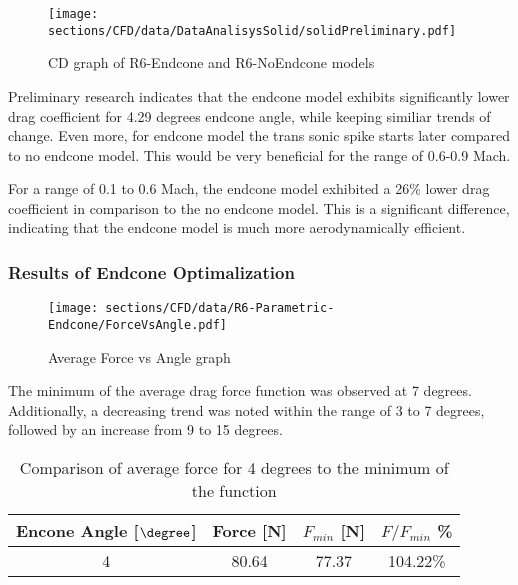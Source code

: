 \begin{figure}[H]
    \centering
    \texttt{[image: sections/CFD/data/DataAnalisysSolid/solidPreliminary.pdf]}
    \caption{CD graph of R6-Endcone and R6-NoEndcone models}
    \label{fig:preliminary}
\end{figure}
Preliminary research indicates that the endcone model exhibits significantly lower drag coefficient
for 4.29 degrees endcone angle, while keeping similiar trends of change. Even more, for endcone model
the trans sonic spike starts later compared to no endcone model. This would be very beneficial for the
range of 0.6-0.9 Mach.  
\begin{table}[H]
    \centering
    \caption{Average values and differences}
\end{table}
For a range of 0.1 to 0.6 Mach, the endcone model exhibited a 26\% lower drag coefficient in 
comparison to the no endcone model. This is a significant difference, indicating that the endcone
model is much more aerodynamically efficient.
\newpage

\subsubsection{Results of Endcone Optimalization}
\begin{figure}[H]
    \centering
    \texttt{[image: sections/CFD/data/R6-Parametric-Endcone/ForceVsAngle.pdf]}
    \caption{Average Force vs Angle graph}
\end{figure}
The minimum of the average drag force function was observed at 7 degrees. Additionally, a 
decreasing trend was noted within the range of 3 to 7 degrees, followed by an increase 
from 9 to 15 degrees.
\begin{table}[h]
    \centering
    \begin{tabular}{|c|c|c|c|}
    \hline
    Encone Angle [$\degree$]& Force [N]& $F_{min}$ [N] & $F/F_{min}$ \%\\
    \hline
    4 & 80.64 & 77.37 & 104.22\% \\
    \hline
    \end{tabular}
    \caption{Comparison of average force for 4 degrees to the minimum of the function}
    \label{tab:ChangeInForce}
\end{table}

